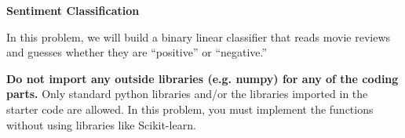 \item {\bf Sentiment Classification}

In this problem, we will build a binary linear classifier that reads movie
reviews and guesses whether they are ``positive'' or ``negative.''

\textbf{Do not import any outside libraries (e.g. numpy) for any of the coding parts.}
Only standard python libraries and/or the libraries imported in the starter code are allowed. In this problem, you must implement the functions without using libraries like Scikit-learn.

\begin{enumerate}

  

  

  

  

  

\end{enumerate}
